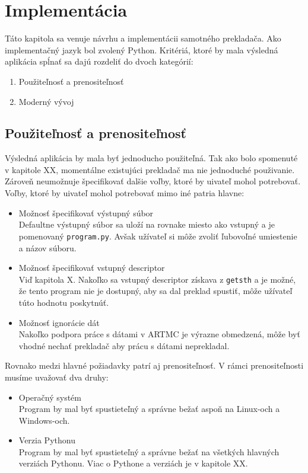 \chapter{Implementácia}
\label{kap_imp}
Táto kapitola sa venuje návrhu a implementácii samotného prekladača.
Ako implementačný jazyk bol zvolený Python. Kritériá, ktoré by mala výsledná
aplikácia spĺnať sa dajú rozdeliť do dvoch kategórií:
\begin{enumerate}
    \item Použiteľnosť a prenositeľnosť
    \item Moderný vývoj
\end{enumerate}

\section{Použiteľnosť a prenositeľnosť}
Výsledná aplikácia by mala byť jednoducho použiteľná. Tak ako bolo spomenuté v
kapitole XX, momentálne existujúci prekladač ma nie jednoduché použivanie. Zároveň
neumožnuje špecifikovať dalšie voľby, ktoré by uivateľ mohol potrebovať. Voľby,
ktoré by uivateľ mohol potrebovať mimo iné patria hlavne:
\begin{itemize}
    \item Možnosť špecifikovať výstupný súbor\\
        Defaultne výstupný súbor sa uloží na rovnake miesto ako vstupný a je
        pomenovaný \texttt{program.py}. Avšak užívateľ si môže zvoliť ľubovoľné umiestenie
        a názov súboru.
    \item Možnosť špecifikovať vstupný descriptor\\
        Viď kapitola X. Nakoľko sa vstupný descriptor získava z \texttt{getsth} a je
        možné, že tento program nie je dostupný, aby sa dal preklad spustiť, môže
        užívateľ túto hodnotu poskytnúť.
    \item Možnosť ignorácie dát\\
        Nakoľko podpora práce s dátami v ARTMC je výrazne obmedzená, môže byť
        vhodné nechať prekladač aby prácu s dátami neprekladal.
\end{itemize}

Rovnako medzi hlavné požiadavky patrí aj prenositeľnosť. V rámci prenositeľnosti
musíme uvažovať dva druhy:
\begin{itemize}
    \item Operačný systém\\
        Program by mal byť spustieteľný a správne bežať aspoň na Linux-och a Windows-och.
    \item Verzia Pythonu\\
        Program by mal byť spustieteľný a správne bežať na všetkých hlavných verziách Pythonu.
        Viac o Pythone a verziách je v kapitole XX.
\end{itemize}

